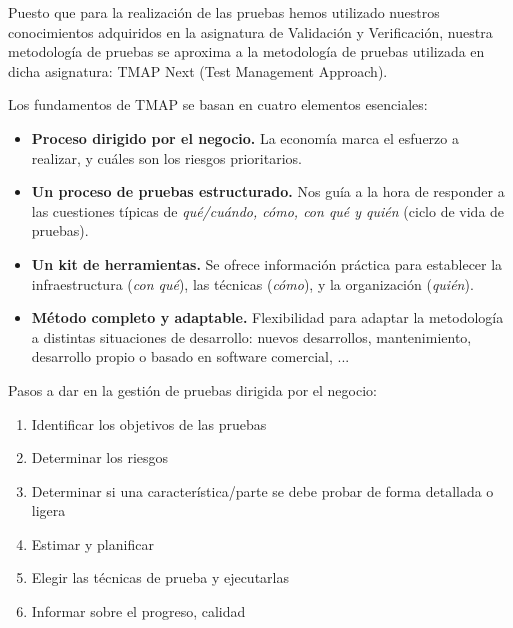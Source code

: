 Puesto que para la realización de las pruebas hemos utilizado nuestros conocimientos adquiridos en
la asignatura de Validación y Verificación, nuestra metodología de pruebas se aproxima a la metodología 
de pruebas utilizada en dicha asignatura: TMAP Next (Test Management Approach).

Los fundamentos de TMAP se basan en cuatro elementos esenciales:
\begin{itemize}
	\item \textbf{Proceso dirigido por el negocio.} La economía marca el esfuerzo a realizar, y cuáles son los riesgos prioritarios.
	\item \textbf{Un proceso de pruebas estructurado.} Nos guía a la hora de responder a las cuestiones típicas de \textit{qué/cuándo, cómo, con qué y quién} (ciclo de vida de pruebas).
	\item \textbf{Un kit de herramientas.} Se ofrece información práctica para establecer la infraestructura (\textit{con qué}), las técnicas (\textit{cómo}), y la organización (\textit{quién}).
	\item \textbf{Método completo y adaptable.} Flexibilidad para adaptar la metodología a distintas situaciones de desarrollo: nuevos desarrollos, mantenimiento, desarrollo propio o basado en software comercial, ...
\end{itemize}

Pasos a dar en la gestión de pruebas dirigida por el negocio:
\begin{enumerate} 
	\item Identificar los objetivos de las pruebas
	\item Determinar los riesgos
	\item Determinar si una característica/parte se debe probar de forma detallada o ligera
	\item Estimar y planificar
	\item Elegir las técnicas de prueba y ejecutarlas 
	\item Informar sobre el progreso, calidad
\end{enumerate}
